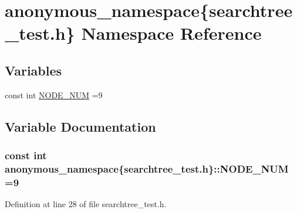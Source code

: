 \hypertarget{namespaceanonymous__namespace_02searchtree__test_8h_03}{}\section{anonymous\+\_\+namespace\{searchtree\+\_\+test.\+h\} Namespace Reference}
\label{namespaceanonymous__namespace_02searchtree__test_8h_03}
\subsection*{Variables}
\begin{DoxyCompactItemize}
\item 
const int \hyperlink{namespaceanonymous__namespace_02searchtree__test_8h_03_ac386a90cf11eb333ec452e8b3f1fcac4}{N\+O\+D\+E\+\_\+\+N\+U\+M} =9
\end{DoxyCompactItemize}


\subsection{Variable Documentation}
\hypertarget{namespaceanonymous__namespace_02searchtree__test_8h_03_ac386a90cf11eb333ec452e8b3f1fcac4}{}
\subsubsection[{N\+O\+D\+E\+\_\+\+N\+U\+M}]{\setlength{\rightskip}{0pt plus 5cm}const int anonymous\+\_\+namespace\{searchtree\+\_\+test.\+h\}\+::N\+O\+D\+E\+\_\+\+N\+U\+M =9}\label{namespaceanonymous__namespace_02searchtree__test_8h_03_ac386a90cf11eb333ec452e8b3f1fcac4}


Definition at line 28 of file searchtree\+\_\+test.\+h.

